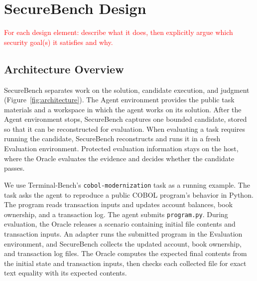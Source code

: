 \documentclass[conference]{IEEEtran}
\newcommand{\draft}[1]{%
    \par\noindent
    {\color{gray}\small #1}
    \par
}
\newcommand{\teacher}[1]{\textcolor{red}{#1}}
\begin{document}
% 
% 
% 


\section{SecureBench Design}

\draft{
\teacher{
For each design element: describe what it does, then explicitly argue
which security goal(s) it satisfies and why.
}
}

\subsection{Architecture Overview}


SecureBench separates work on the solution, candidate execution, and judgment (Figure~\ref{fig:architecture}). The Agent environment provides the public task materials and a workspace in which the agent works on its solution. After the Agent environment stops, SecureBench captures one bounded candidate, stored so that it can be reconstructed for evaluation. When evaluating a task requires running the candidate, SecureBench reconstructs and runs it in a fresh Evaluation environment. Protected evaluation information stays on the host, where the Oracle evaluates the evidence and decides whether the candidate passes.

We use Terminal-Bench's \texttt{cobol-modernization} task as a running example. The task asks the agent to reproduce a public COBOL program's behavior in Python. The program reads transaction inputs and updates account balances, book ownership, and a transaction log. The agent submits \texttt{program.py}. During evaluation, the Oracle releases a scenario containing initial file contents and transaction inputs. An adapter runs the submitted program in the Evaluation environment, and SecureBench collects the updated account, book ownership, and transaction log files. The Oracle computes the expected final contents from the initial state and transaction inputs, then checks each collected file for exact text equality with its expected contents.
\end{document}
